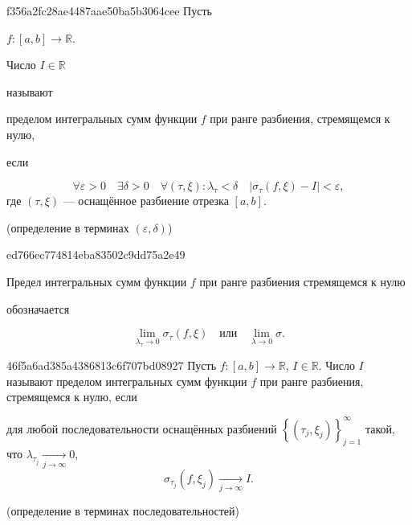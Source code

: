 \begin{note}{f356a2fc28ae4487aae50ba5b3064cee}
    Пусть \begin{icloze}{3}\( f : [a, b] \to \mathbb R \).\end{icloze}
    \begin{icloze}{4}Число \( I \in \mathbb R \)\end{icloze} называют \begin{icloze}{2}пределом интегральных сумм функции \( f \) при ранге разбиения, стремящемся к нулю,\end{icloze} если
    \begin{icloze}{1}
        \[
            \forall \varepsilon > 0 \quad \exists \delta > 0 \quad \forall (\tau, \xi) : \lambda_\tau < \delta \quad \left| \sigma_\tau (f, \xi) - I \right| < \varepsilon,
        \]
        где \( (\tau, \xi) \) --- оснащённое разбиение отрезка \( [a, b] \).
    \end{icloze}

    \begin{center}
        \tiny (определение в терминах \( (\varepsilon, \delta) \))
    \end{center}
\end{note}

\begin{note}{ed766ec774814eba83502c9dd75a2e49}
    \begin{icloze}{2}Предел интегральных сумм функции \( f \) при ранге разбиения стремящемся к нулю\end{icloze} обозначается
    \begin{icloze}{1}
        \[
            \lim_{\lambda_\tau \to 0} \sigma_\tau (f, \xi) \quad \text{или} \quad \lim_{\lambda \to 0} \sigma.
        \]
    \end{icloze}
\end{note}

\begin{note}{46f5a6ad385a4386813c6f707bd08927}
    Пусть \( f : [a, b] \to \mathbb R \), \( I \in \mathbb R \).
    Число \( I \) называют пределом интегральных сумм функции \( f \) при ранге разбиения, стремящемся к нулю, если
    \begin{icloze}{1}
        для любой последовательности оснащённых разбиений \( \left\{ (\tau_j, \xi_j) \right\}_{j = 1}^{\infty} \) такой, что \( \lambda_{\tau_j} \underset{j \to \infty}\longrightarrow 0 \),
    \[
        \sigma_{\tau_j} (f, \xi_j) \underset{j \to \infty}\longrightarrow I.
    \]
    \end{icloze}

    \begin{center}
        \tiny (определение в терминах последовательностей)
    \end{center}
\end{note}

